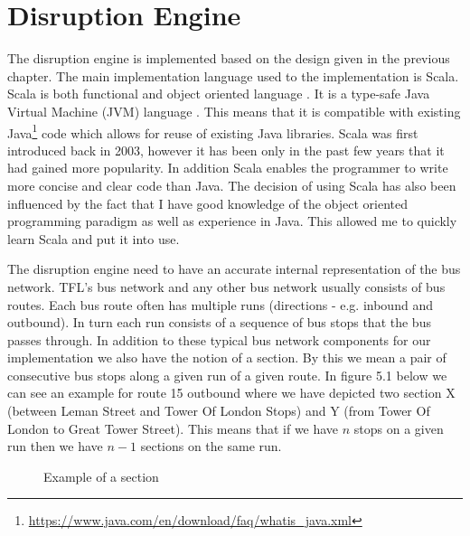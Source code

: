 \section{Disruption Engine}
The disruption engine is implemented based on the design given in the previous chapter. The main implementation language used to the implementation is Scala. Scala is both functional and object oriented language \cite{odersky2008programming}. It is a type-safe Java Virtual Machine (JVM) language  \cite{odersky2008programming}. This means that it is compatible with existing Java\footnote{\url{https://www.java.com/en/download/faq/whatis_java.xml}} code which allows for reuse of existing Java libraries. Scala was first introduced back in 2003, however it has been only in the past few years that it had gained more popularity. In addition Scala enables the programmer to write more concise and clear code than Java. The decision of using Scala has also been influenced by the fact that I have good knowledge of the object oriented programming paradigm as well as experience in Java. This allowed me to quickly learn Scala and put it into use.

The disruption engine need to have an accurate internal representation of the bus network. TFL's bus network and any other bus network usually consists of bus routes. Each bus route often has multiple runs (directions - e.g. inbound and outbound). In turn each run consists of a sequence of bus stops that the bus passes through. In addition to these typical bus network components for our implementation we also have the notion of a section. By this we mean a pair of consecutive bus stops along a given run of a given route. In figure 5.1 below we can see an example for route 15 outbound where we have depicted two section X (between Leman Street and Tower Of London Stops) and Y (from Tower Of London to Great Tower Street). This means that if we have $n$ stops on a given run then we have $n-1$ sections on the same run.

\begin{figure}[ht]
	\caption{Example of a section}
	\label{fig:sectionExample}
\end{figure}

